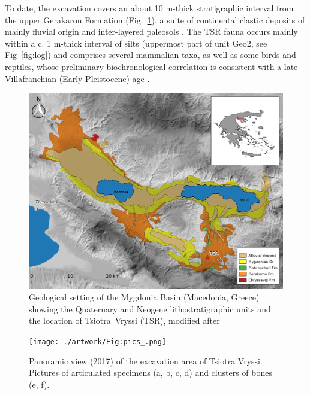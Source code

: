 \documentclass[review,times,authoryear]{elsarticle} %
\begin{document}
To date, the excavation covers an about 10 m-thick stratigraphic interval from the upper Gerakarou Formation (Fig.~\ref{fig:1}), a suite of continental clastic deposits of mainly fluvial origin and inter-layered paleosols \citep{Koufos1995,Konidaris2015}. The TSR fauna occurs mainly within a c. 1 m-thick interval of silts (uppermost part of unit Geo2, see Fig~\ref{fig:log}) and comprises several mammalian taxa, as well as some birds and reptiles, whose preliminary biochronological correlation is consistent with a late Villafranchian (Early Pleistocene) age \citep{Konidaris2015,Konidaris2016}.

\begin{figure}[]
  \centering
  \includegraphics[width=1\textwidth]{./artwork/Fig1.png}
  \caption{Geological setting of the Mygdonia Basin (Macedonia, Greece) showing the Quaternary and Neogene lithostratigraphic units and the location of Tsiotra~Vryssi (TSR), modified after \cite{Koufos1995}}
  \label{fig:1}
\end{figure}

\begin{figure}[]
  \centering
  \texttt{[image: ./artwork/Fig:pics\_.png]}
  \caption{Panoramic view (2017) of the excavation area of Tsiotra Vryssi. Pictures of articulated specimens (a, b, c, d) and clusters of bones (e, f).}
  \label{fig:pics}
\end{figure}
\end{document}
